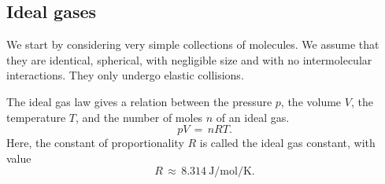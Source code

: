 \documentclass[11pt]{article}
\theoremstyle{definition}
\theoremstyle{remark}
\numberwithin{equation}{section}
\begin{document}
    \subsection{Ideal gases}
    We start by considering very simple collections of molecules. We assume that
    they are identical, spherical, with negligible size and with no intermolecular
    interactions. They only undergo elastic collisions.


    \begin{theorem}
        The ideal gas law gives a relation between the pressure $p$, the volume $V$,
        the temperature $T$, and the number of moles $n$ of an ideal gas.
        \[
            pV \,=\, nRT.
        \]
        Here, the constant of proportionality $R$ is called the ideal gas constant,
        with value \[
            R \,\approx\, \SI{8.314}{\joule\per\mole\per\kelvin}.
        \]
    \end{theorem}
\end{document}

